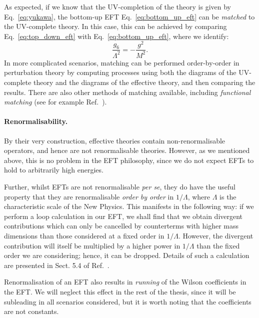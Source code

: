 \documentclass[withindex,glossary]{cam-thesis}
\begin{document}
As expected, if we know that the UV-completion of the theory is given by Eq.~\eqref{eq:yukawa}, the bottom-up EFT Eq.~\eqref{eq:bottom_up_eft} can be \textit{matched} to the UV-complete theory. In this case, this can be achieved by comparing Eq.~\eqref{eq:top_down_eft} with Eq.~\eqref{eq:bottom_up_eft}, where we identify:
\begin{equation}
\frac{g_6}{\Lambda^2} = -\frac{g^2}{M^2}.
\end{equation}
In more complicated scenarios, matching can be performed order-by-order in perturbation theory by computing processes using both the diagrams of the UV-complete theory and the diagrams of the effective theory, and then comparing the results. There are also other methods of matching available, including \textit{functional matching} (see for example Ref.~\cite{Henning:2014wua}). 

\paragraph{Renormalisability.} By their very construction, effective theories contain non-renormalisable operators, and hence are not renormalisable theories. However, as we mentioned above, this is no problem in the EFT philosophy, since we do not expect EFTs to hold to arbitrarily high energies. 

Further, whilst EFTs are not renormalisable \textit{per se}, they do have the useful property that they are renormalisable \textit{order by order} in $1/\Lambda$, where $\Lambda$ is the characteristic scale of the New Physics. This manifests in the following way: if we perform a loop calculation in our EFT, we shall find that we obtain divergent contributions which can only be cancelled by counterterms with higher mass dimensions than those considered at a fixed order in $1/\Lambda$. However, the divergent contribution will itself be multiplied by a higher power in $1/\Lambda$ than the fixed order we are considering; hence, it can be dropped. Details of such a calculation are presented in Sect. 5.4 of Ref.~\cite{Manohar:2018aog}.

Renormalisation of an EFT also results in \textit{running} of the Wilson coefficients in the EFT. We will neglect this effect in the rest of the thesis, since it will be subleading in all scenarios considered, but it is worth noting that the coefficients are not constants.
\end{document}
